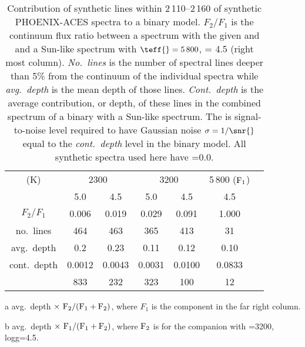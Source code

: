 
\begin{table}
    \small
    \centering
    \begin{threeparttable}[b]
        \caption[Analysis of spectral line depths.]{Contribution of synthetic lines within 2\,110--2\,160\nm{} of synthetic {PHOENIX-ACES} spectra to a binary model. \(F_{2}/F_{1}\) is the continuum flux ratio between a spectrum with the given \txteff{} and \logg{} and a Sun-like spectrum with \(\teff{}=5\,800\),\logg{} = 4.5 (right most column). \emph{No.\ lines} is the number of spectral lines deeper than 5\% from the continuum of the individual spectra while \emph{avg.\ depth} is the mean depth of those lines. \emph{Cont.\ depth} is the average contribution, or depth, of these lines in the combined spectrum of a binary with a Sun-like spectrum. The \snr{} is signal-to-noise level required to have Gaussian noise \(\sigma=1/\snr{}\)  equal to the \emph{cont.\ depth} level in the binary model. All synthetic spectra used here have \feh{}=0.0.}
        \begin{tabular}{*7c}
            \toprule
            \teff{} (K)  & \multicolumn{2}{c}{2300} & \multicolumn{2}{c}{3200} & 5\,800 (\(\rm F_1\))\\
           \logg{} & 5.0 & 4.5  & 5.0 & 4.5 & 4.5 \\
            \midrule
            \(F_2/F_1\) & 0.006 & 0.019 & 0.029  & 0.091 & 1.000 \\
            no.\ lines & 464 & 463 & 365  & 413 & 31 \\
            avg.\ depth & 0.2  & 0.23& 0.11 & 0.12 & 0.10 \\
            cont.\ depth\tnote{a} &  0.0012 & 0.0043 &  0.0031 & 0.0100&  0.0833\tnote{b} \\
            \snr{}  & 833 & 232 & 323  & 100 & 12 \\
            \bottomrule
        \end{tabular}\label{tab:line_contributions}
        \begin{tablenotes}
            \item [a] avg.\ depth \(\times~ \rm F_2 / (F_1 + F_2)\), where \(F_1\) is the component in the far right column.
            \item[b] avg.\ depth \(\times~ \rm F_1 / (F_1 + F_2)\), where \(\rm F_2\) is for the companion with \teff{}=3200, logg=4.5.
        \end{tablenotes}
    \end{threeparttable}
\end{table}
